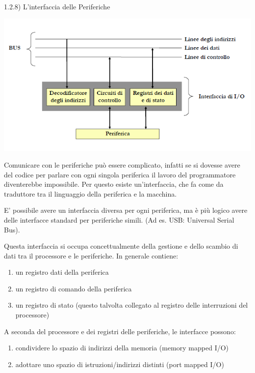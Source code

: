 \documentclass[
  paper=a4,
  oneside  ,captions=tableheading
]{scrbook}
\providecommand{\tightlist}{%
  \setlength{\itemsep}{0pt}\setlength{\parskip}{0pt}}
\begin{document}
1.2.8) L'interfaccia delle Periferiche
\begin{center}
\includegraphics{./image/image-20201112230056001.png}
\end{center}
Comunicare con le periferiche può essere complicato, infatti se si
dovesse avere del codice per parlare con ogni singola periferica il
lavoro del programmatore diventerebbe impossibile. Per questo esiste
un'interfaccia, che fa come da traduttore tra il linguaggio della
periferica e la macchina.

E' possibile avere un interfaccia diversa per ogni periferica, ma è più
logico avere delle interfacce standard per periferiche simili. (Ad es.
USB: Universal Serial Bus).

Questa interfaccia si occupa concettualmente della gestione e dello
scambio di dati tra il processore e le periferiche. In generale
contiene:

\begin{enumerate}
\def\labelenumi{\arabic{enumi}.}
\tightlist
\item
  un registro dati della periferica
\item
  un registro di comando della periferica
\item
  un registro di stato (questo talvolta collegato al registro delle
  interruzioni del processore)
\end{enumerate}

A seconda del processore e dei registri delle periferiche, le interfacce
possono:

\begin{enumerate}
\def\labelenumi{\arabic{enumi}.}
\tightlist
\item
  condividere lo spazio di indirizzi della memoria (memory mapped I/O)
\item
  adottare uno spazio di istruzioni/indirizzi distinti (port mapped I/O)
\end{enumerate}
\end{document}
